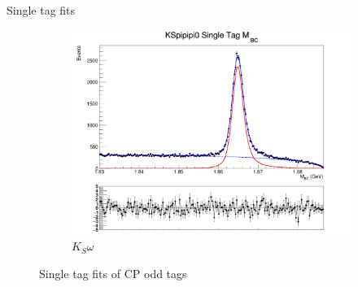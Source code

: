 \documentclass{beamer}
\begin{document}
\begin{frame}{Single tag fits}
\begin{figure}
\begin{subfigure}{0.33\textwidth}
      \includegraphics[width=1.0\textwidth]{Plots/KSpipipi0_SingleTag_MBC_Plot.png}
      \caption{$K_S\omega$}
    \end{subfigure}
    \caption{Single tag fits of CP odd tags}
  \end{figure}
\end{frame}
\end{document}
